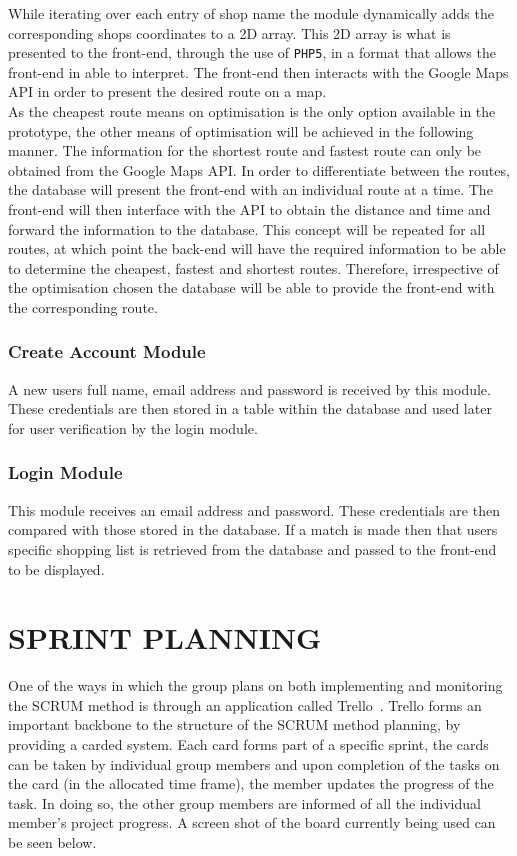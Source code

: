 \documentclass[10pt,twocolumn]{witseiepaper}
\begin{document}
		While iterating over each entry of shop name the module dynamically adds the corresponding shops coordinates to a 2D array. This 2D array is what is presented to the front-end, through the use of \texttt{PHP5}, in a format that allows the front-end in able to interpret. The front-end then interacts with the Google Maps API in order to present the desired route on a map.\\
		
		As the cheapest route means on optimisation is the only option available in the prototype, the other means of optimisation will be achieved in the following manner. The information for the shortest route and fastest route can only be obtained from the Google Maps API. In order to differentiate between the routes, the database will present the front-end with an individual route at a time. The front-end will then interface with the API to obtain the distance and time and forward the information to the database. This concept will be repeated for all routes, at which point the back-end will have the required information to be able to determine the cheapest, fastest and shortest routes. Therefore, irrespective of the optimisation chosen the database will be able to provide the front-end with the corresponding route.
		
		\subsubsection{Create Account Module}
		
		A new users full name, email address and password is received by this module. These credentials are then stored in a table within the database and used later for user verification by the login module.
		
		\subsubsection{Login Module}
		
		This module receives an email address and password. These credentials are then compared with those stored in the database. If a match is made then that users specific shopping list is retrieved from the database and passed to the front-end to be displayed.
		

\section{SPRINT PLANNING}

	One of the ways in which the group plans on both implementing and monitoring the SCRUM method is through an application called Trello~\cite{trello}. Trello forms an important backbone to the structure of the SCRUM method planning, by providing a carded system. Each card forms part of a specific sprint, the cards can be taken by individual group members and upon completion of the tasks on the card (in the allocated time frame), the member updates the progress of the task. In doing so, the other group members are informed of all the individual member's project progress. A screen shot of the board currently being used can be seen below. 
	
\end{document}

